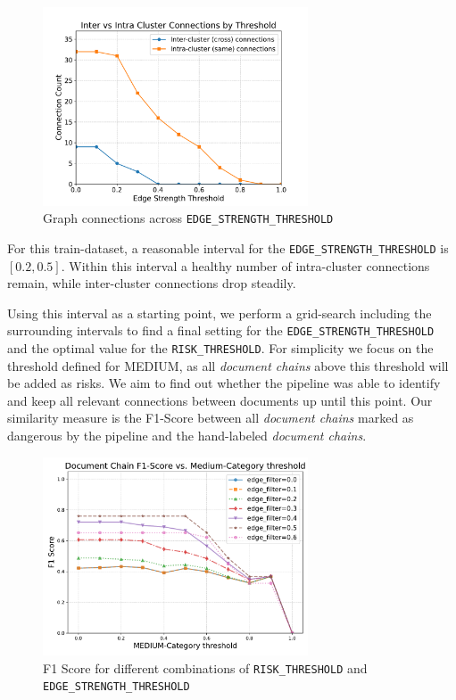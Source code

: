 \begin{figure}[h]
    \centering
    \includegraphics[width=0.7\textwidth]{figures/c2_cluster_connections_counts.pdf}
    \caption{Graph connections across \texttt{EDGE\_STRENGTH\_THRESHOLD}}
    \label{approach-fig:strength_connection_counts}
\end{figure}  

For this train-dataset, a reasonable interval for the \texttt{EDGE\_STRENGTH\_THRESHOLD} is $[0.2,0.5]$. Within this interval a healthy number of intra-cluster connections remain, while inter-cluster connections drop steadily. 

Using this interval as a starting point, we perform a grid-search including the surrounding intervals to find a final setting for the \texttt{EDGE\_STRENGTH\_THRESHOLD} and the optimal value for the \texttt{RISK\_THRESHOLD}. For simplicity we focus on the threshold defined for MEDIUM, as all \textit{document chains} above this threshold will be added as risks. We aim to find out whether the pipeline was able to identify and keep all relevant connections between documents up until this point. Our similarity measure is the F1-Score between all \textit{document chains} marked as dangerous by the pipeline and the hand-labeled \textit{document chains}. 

\begin{figure}[h]
    \centering
    \includegraphics[width=0.7\textwidth]{figures/c2_f1_comparison.pdf}
    \caption{F1 Score for different combinations of \texttt{RISK\_THRESHOLD} and \texttt{EDGE\_STRENGTH\_THRESHOLD}}
    \label{approach-fig:f1_chain_score}
\end{figure} 

